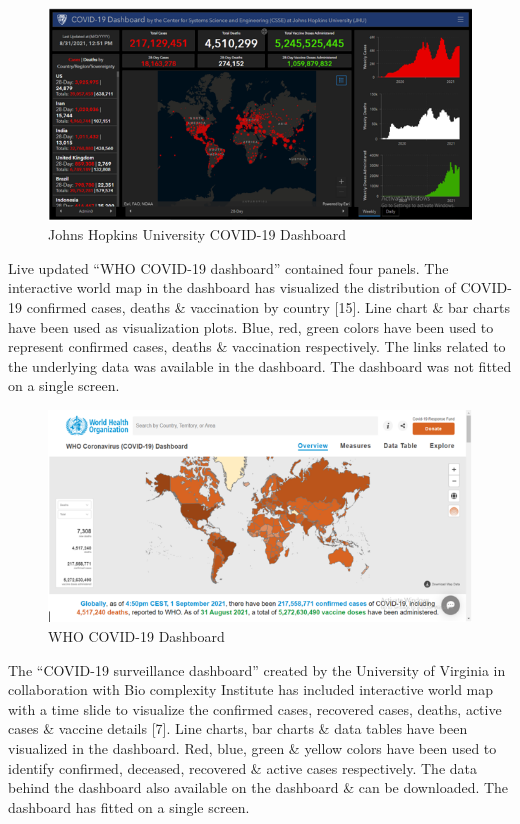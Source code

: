 \documentclass[
]{article}
\begin{document}
\begin{figure}
\includegraphics[width=8.42in]{Images/1} \caption{Johns Hopkins University COVID-19 Dashboard}\label{fig:unnamed-chunk-1}
\end{figure}

Live updated ``WHO COVID-19 dashboard'' contained four panels. The
interactive world map in the dashboard has visualized the distribution
of COVID-19 confirmed cases, deaths \& vaccination by country {[}15{]}.
Line chart \& bar charts have been used as visualization plots. Blue,
red, green colors have been used to represent confirmed cases, deaths \&
vaccination respectively. The links related to the underlying data was
available in the dashboard. The dashboard was not fitted on a single
screen.

\begin{figure}
\includegraphics[width=8.35in]{Images/2} \caption{WHO COVID-19 Dashboard}\label{fig:unnamed-chunk-2}
\end{figure}

The ``COVID-19 surveillance dashboard'' created by the University of
Virginia in collaboration with Bio complexity Institute has included
interactive world map with a time slide to visualize the confirmed
cases, recovered cases, deaths, active cases \& vaccine details {[}7{]}.
Line charts, bar charts \& data tables have been visualized in the
dashboard. Red, blue, green \& yellow colors have been used to identify
confirmed, deceased, recovered \& active cases respectively. The data
behind the dashboard also available on the dashboard \& can be
downloaded. The dashboard has fitted on a single screen.
\end{document}
